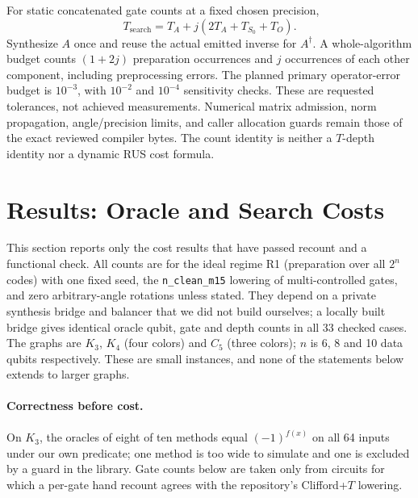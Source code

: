 \documentclass[sigconf, natbib]{acmart}
\begin{document}
For static concatenated gate counts at a fixed chosen precision,
\begin{equation}
 T_{\mathrm{search}}=T_A+j(2T_A+T_{S_0}+T_O).
 \label{eq:search-cost}
\end{equation}
Synthesize $A$ once and reuse the actual emitted inverse for $A^\dagger$. A whole-algorithm budget counts $(1+2j)$ preparation occurrences and $j$ occurrences of each other component, including preprocessing errors. The planned primary operator-error budget is $10^{-3}$, with $10^{-2}$ and $10^{-4}$ sensitivity checks. These are requested tolerances, not achieved measurements. Numerical matrix admission, norm propagation, angle/precision limits, and caller allocation guards remain those of the exact reviewed compiler bytes. The count identity is neither a $T$-depth identity nor a dynamic RUS cost formula.

\section{Results: Oracle and Search Costs}
\label{sec:results-cost}
This section reports only the cost results that have passed recount and a functional check. All counts are for the ideal regime R1 (preparation over all $2^n$ codes) with one fixed seed, the \texttt{n\_clean\_m15} lowering of multi-controlled gates, and zero arbitrary-angle rotations unless stated. They depend on a private synthesis bridge and balancer that we did not build ourselves; a locally built bridge gives identical oracle qubit, gate and depth counts in all 33 checked cases. %
The graphs are $K_3$, $K_4$ (four colors) and $C_5$ (three colors); $n$ is 6, 8 and 10 data qubits respectively. These are small instances, and none of the statements below extends to larger graphs.

\paragraph{Correctness before cost.} On $K_3$, the oracles of eight of ten methods equal $(-1)^{f(x)}$ on all 64 inputs under our own predicate; one method is too wide to simulate and one is excluded by a guard in the library. %
Gate counts below are taken only from circuits for which a per-gate hand recount agrees with the repository's Clifford+$T$ lowering. %


\end{document}
